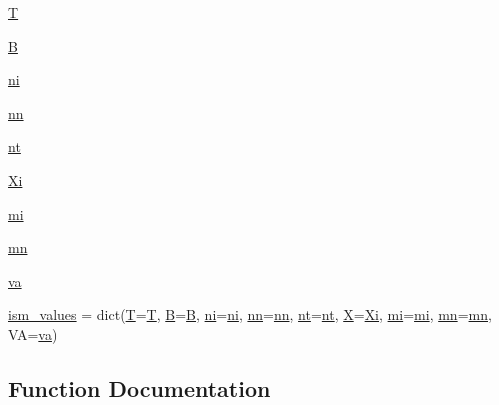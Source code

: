 \begin{DoxyCompactItemize}
$$\item 
\hyperlink{namespacenamelist__adv_a6f719a9f9216dd79aade2fc13972f575}{T}
\item 
\hyperlink{namespacenamelist__adv_a375539f1a9c2e7e2e879f164603f4a93}{B}
\item 
\hyperlink{namespacenamelist__adv_a8cdd5b152506f50859a6cae9348236b8}{ni}
\item 
\hyperlink{namespacenamelist__adv_a4d7c79e9a8164cf6ac9127b3bcb80ee2}{nn}
\item 
\hyperlink{namespacenamelist__adv_a28d50a79e884d95eb5fccdb1192fccab}{nt}
\item 
\hyperlink{namespacenamelist__adv_abfdc4e4c18b25ee50148017055085bfe}{Xi}
\item 
\hyperlink{namespacenamelist__adv_af9c7e2f258f5cbbaa0e325a3d3e9b834}{mi}
\item 
\hyperlink{namespacenamelist__adv_a06880564a76b1cc2c258a72685de5306}{mn}
\item 
\hyperlink{namespacenamelist__adv_a85011932bf2e7b9c4321e9c8047f6190}{va}
\item 
\hyperlink{namespacenamelist__adv_a98296ab4f433f14e6a84a04282df12b8}{ism\+\_\+values} = dict(\hyperlink{namespacenamelist__adv_a6f719a9f9216dd79aade2fc13972f575}{T}=\hyperlink{namespacenamelist__adv_a6f719a9f9216dd79aade2fc13972f575}{T}, \hyperlink{namespacenamelist__adv_a375539f1a9c2e7e2e879f164603f4a93}{B}=\hyperlink{namespacenamelist__adv_a375539f1a9c2e7e2e879f164603f4a93}{B}, \hyperlink{namespacenamelist__adv_a8cdd5b152506f50859a6cae9348236b8}{ni}=\hyperlink{namespacenamelist__adv_a8cdd5b152506f50859a6cae9348236b8}{ni}, \hyperlink{namespacenamelist__adv_a4d7c79e9a8164cf6ac9127b3bcb80ee2}{nn}=\hyperlink{namespacenamelist__adv_a4d7c79e9a8164cf6ac9127b3bcb80ee2}{nn}, \hyperlink{namespacenamelist__adv_a28d50a79e884d95eb5fccdb1192fccab}{nt}=\hyperlink{namespacenamelist__adv_a28d50a79e884d95eb5fccdb1192fccab}{nt}, \hyperlink{namespacenamelist__adv_a5e3fd8ce9424ffcd8cd805216d953ad0}{X}=\hyperlink{namespacenamelist__adv_abfdc4e4c18b25ee50148017055085bfe}{Xi}, \hyperlink{namespacenamelist__adv_af9c7e2f258f5cbbaa0e325a3d3e9b834}{mi}=\hyperlink{namespacenamelist__adv_af9c7e2f258f5cbbaa0e325a3d3e9b834}{mi}, \hyperlink{namespacenamelist__adv_a06880564a76b1cc2c258a72685de5306}{mn}=\hyperlink{namespacenamelist__adv_a06880564a76b1cc2c258a72685de5306}{mn}, VA=\hyperlink{namespacenamelist__adv_a85011932bf2e7b9c4321e9c8047f6190}{va})
\end{DoxyCompactItemize}


\subsection{Function Documentation}
\mbox{\label{namespacenamelist__adv_a68979a64f53a14e42b6964071cab8820}} 
